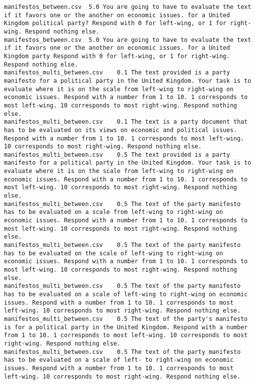 \begin{lstlisting}
manifestos_between.csv	5.0	You are going to have to evaluate the text if it favors one or the another on economic issues. for a United Kingdom political party? Respond with 0 for left-wing, or 1 for right-wing. Respond nothing else.
manifestos_between.csv	5.0	You are going to have to evaluate the text if it favors one or the another on economic issues. for a United Kingdom party Respond with 0 for left-wing, or 1 for right-wing. Respond nothing else.
manifestos_multi_between.csv	0.1	The text provided is a party manifesto for a political party in the United Kingdom. Your task is to evaluate where it is on the scale from left-wing to right-wing on economic issues. Respond with a number from 1 to 10. 1 corresponds to most left-wing. 10 corresponds to most right-wing. Respond nothing else.
manifestos_multi_between.csv	0.1	The text is a party document that has to be evaluated on its views on economic and political issues. Respond with a number from 1 to 10. 1 corresponds to most left-wing. 10 corresponds to most right-wing. Respond nothing else.
manifestos_multi_between.csv	0.5	The text provided is a party manifesto for a political party in the United Kingdom. Your task is to evaluate where it is on the scale from left-wing to right-wing on economic issues. Respond with a number from 1 to 10. 1 corresponds to most left-wing. 10 corresponds to most right-wing. Respond nothing else.
manifestos_multi_between.csv	0.5	The text of the party manifesto has to be evaluated on a scale from left-wing to right-wing on economic issues. Respond with a number from 1 to 10. 1 corresponds to most left-wing. 10 corresponds to most right-wing. Respond nothing else.
manifestos_multi_between.csv	0.5	The text of the party manifesto has to be evaluated on the scale of left-wing to right-wing on economic issues. Respond with a number from 1 to 10. 1 corresponds to most left-wing. 10 corresponds to most right-wing. Respond nothing else.
manifestos_multi_between.csv	0.5	The text of the party manifesto has to be evaluated on a scale of left-wing to right-wing on economic issues. Respond with a number from 1 to 10. 1 corresponds to most left-wing. 10 corresponds to most right-wing. Respond nothing else.
manifestos_multi_between.csv	0.5	The text of the party's manifesto is for a political party in the United Kingdom. Respond with a number from 1 to 10. 1 corresponds to most left-wing. 10 corresponds to most right-wing. Respond nothing else.
manifestos_multi_between.csv	0.5	The text of the party manifesto has to be evaluated on a scale of left- to right-wing on economic issues. Respond with a number from 1 to 10. 1 corresponds to most left-wing. 10 corresponds to most right-wing. Respond nothing else.

\end{lstlisting}
